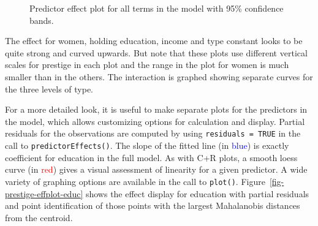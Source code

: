 \documentclass[
  letterpaper,
  10pt,
  krantz2]{krantz}
\begin{document}
\begin{figure}[H]


\caption{\label{fig-prestige-allEffects}Predictor effect plot for all
terms in the model with 95\% confidence bands.}

\end{figure}%

The effect for women, holding education, income and type constant looks
to be quite strong and curved upwards. But note that these plots use
different vertical scales for prestige in each plot and the range in the
plot for women is much smaller than in the others. The interaction is
graphed showing separate curves for the three levels of type.

For a more detailed look, it is useful to make separate plots for the
predictors in the model, which allows customizing options for
calculation and display. Partial residuals for the observations are
computed by using \texttt{residuals\ =\ TRUE} in the call to
\texttt{predictorEffects()}. The slope of the fitted line (in
\textcolor{blue}{blue}) is exactly coefficient for education in the full
model. As with C+R plots, a smooth loess curve (in \textcolor{red}{red})
gives a visual assessment of linearity for a given predictor. A wide
variety of graphing options are available in the call to
\texttt{plot()}. Figure~\ref{fig-prestige-effplot-educ} shows the effect
display for education with partial residuals and point identification of
those points with the largest Mahalanobis distances from the centroid.
\end{document}
